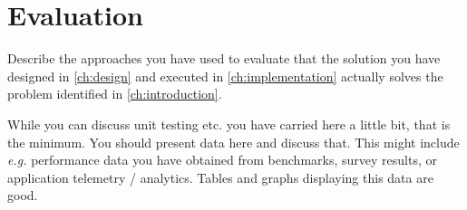 \chapter{Evaluation}
\label{ch:evaluation}

Describe the approaches you have used to evaluate that the solution you have designed in \ref{ch:design} and executed in \ref{ch:implementation} actually solves the problem identified in \ref{ch:introduction}.

While you can discuss unit testing etc. you have carried here a little bit, that is the minimum. You should present data here and discuss that. This might include \emph{e.g.} performance data you have obtained from benchmarks, survey results, or application telemetry / analytics. Tables and graphs displaying this data are good.
